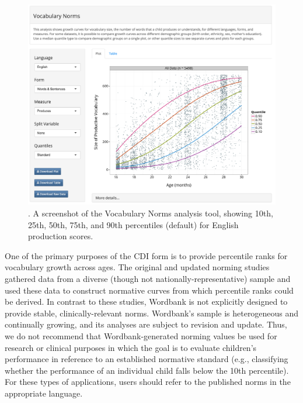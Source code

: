 \documentclass[doc,noapacite]{apa2}
\begin{document}
\begin{figure}[th]
\includegraphics[width=6.5in]{figures/normsapp.png}
\caption{\label{fig:norms}. A screenshot of the Vocabulary Norms analysis tool, showing 10th, 25th, 50th, 75th, and 90th percentiles (default) for English production scores.}
\end{figure}

One of the primary purposes of the CDI form is to provide percentile ranks for vocabulary growth across ages. The original and updated norming studies \cite{fenson1994,fenson2007} gathered data from a diverse (though not nationally-representative) sample and used these data to construct normative curves from which percentile ranks could be derived. In contrast to these studies, Wordbank is not explicitly designed to provide stable, clinically-relevant norms. Wordbank's sample is heterogeneous and continually growing, and its analyses are subject to revision and update. Thus, we do not recommend that Wordbank-generated norming values be used for research or clinical purposes in which the goal is to evaluate children's performance in reference to an established normative standard (e.g., classifying whether the performance of an individual child falls below the 10th percentile). For these types of applications, users should refer to the published norms in the appropriate language. 
\end{document}
